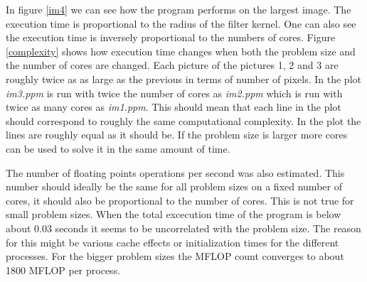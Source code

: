 \documentclass[a4paper,11pt]{article}
\begin{document}
In figure \ref{im4} we can see how the program performs on the largest image.
The execution time is proportional to the radius of the filter kernel.
One can also see the execution time is inversely proportional to the numbers of cores.
Figure \ref{complexity} shows how execution time changes when both the problem size and the number of cores are changed.
Each picture of the pictures 1, 2 and 3 are roughly twice as as large as the previous in terms of number of pixels.
In the plot \emph{im3.ppm} is run with twice the number of cores as \emph{im2.ppm} which is run with twice as many cores as \emph{im1.ppm}.
This should mean that each line in the plot should correspond to roughly the same computational complexity.
In the plot the lines are roughly equal as it should be.
If the problem size is larger more cores can be used to solve it in the same amount of time.

The number of floating points operations per second was also estimated.
This number should ideally be the same for all problem sizes on a fixed number of cores, it should also be proportional to the number of cores.
This is not true for small problem sizes.
When the total excecution time of the program is below about 0.03 seconds it seems to be uncorrelated with the problem size.
The reason for this might be various cache effects or initialization times for the different processes.
For the bigger problem sizes the MFLOP count converges to about 1800 MFLOP per process.
\end{document}
